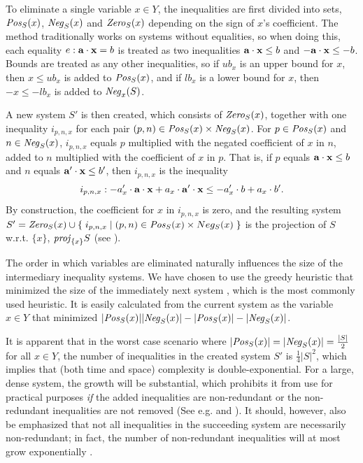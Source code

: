 To eliminate a single variable $x\in Y$, the inequalities are first divided into sets, $\mathit{Pos}_S(x)$, $\mathit{Neg}_S(x)$ and $\mathit{Zero}_S(x)$ depending on the sign of $x$'s coefficient. The method traditionally works on systems without equalities, so when doing this, each equality $e: \mathbf{a}\cdot\mathbf{x} = b$ is treated as two inequalities $\mathbf{a}\cdot\mathbf{x} \leq b$ and $-\mathbf{a}\cdot\mathbf{x} \leq -b$. Bounds are treated as any other inequalities, so if $ub_x$ is an upper bound for $x$, then $x\leq ub_x$ is added to $\mathit{Pos}_S(x)$, and if $lb_x$ is a lower bound for $x$, then $-x\leq - lb_x$ is added to $\mathit{Neg}_x(S)$.

A new system $S'$ is then created, which consists of $\mathit{Zero}_S(x)$, together with one inequality $i_{p,n,x}$ for each pair $(p,n)\in \mathit{Pos}_S(x)\times \mathit{Neg}_S(x)$. For $p\in \mathit{Pos}_S(x)$ and $n\in \mathit{Neg}_S(x)$, $i_{p,n,x}$ equals $p$ multiplied with the negated coefficient of $x$ in $n$, added to $n$ multiplied with the coefficient of $x$ in $p$.  That is, if $p$ equals $\mathbf{a}\cdot\mathbf{x} \leq b$ and $n$ equals $\mathbf{a}'\cdot\mathbf{x} \leq b'$, then $i_{p,n,x}$ is the inequality 
\[
i_{p,n,x}: -a'_x\cdot \mathbf{a}\cdot\mathbf{x} + a_x\cdot \mathbf{a}'\cdot\mathbf{x} \leq -a'_x\cdot b + a_x\cdot b'.
\]
By construction, the coefficient for $x$ in $i_{p,n,x}$ is zero, and the resulting system $S' = \mathit{Zero}_S(x) \cup\\
\{\;{i_{p,n,x}}\;|\;{(p,n)\in \mathit{Pos}_S(x)\times Neg_S(x)}\;\}$ is the projection of $S$ w.r.t. $\{x\}$, $\mathit{proj}_{\{x\}}S$ (see \cite{MyTechRep}). %

The order in which variables are eliminated naturally influences the size of the intermediary inequality systems. We have chosen to use the greedy heuristic that minimized the size of the immediately next system \cite{duffin74}, which is the most commonly used heuristic. It is easily calculated from the current system as the variable $x\in Y$ that minimized $|\mathit{Pos}_S(x)||\mathit{Neg}_S(x)| - |\mathit{Pos}_S(x)|-|\mathit{Neg}_S(x)|$. 


It is apparent that in the worst case scenario where $|\mathit{Pos}_S(x)| = |\mathit{Neg}_S(x)| = \frac{|S|}{2}$ for all $x\in Y$, the number of inequalities in the created system $S'$ is $\frac{1}{4}|S|^2$, which implies that (both time and space) complexity is double-exponential. For a large, dense system, the growth will be substantial, which prohibits it from use for practical purposes \emph{if} the added inequalities are non-redundant or the non-redundant inequalities are not removed ({See e.g. \cite{lassez93} and \cite{lukatskii08}}). It should, however, also be emphasized that not all inequalities in the succeeding system are necessarily non-redundant; in fact, the number of non-redundant inequalities will at most grow exponentially \cite{?}.

